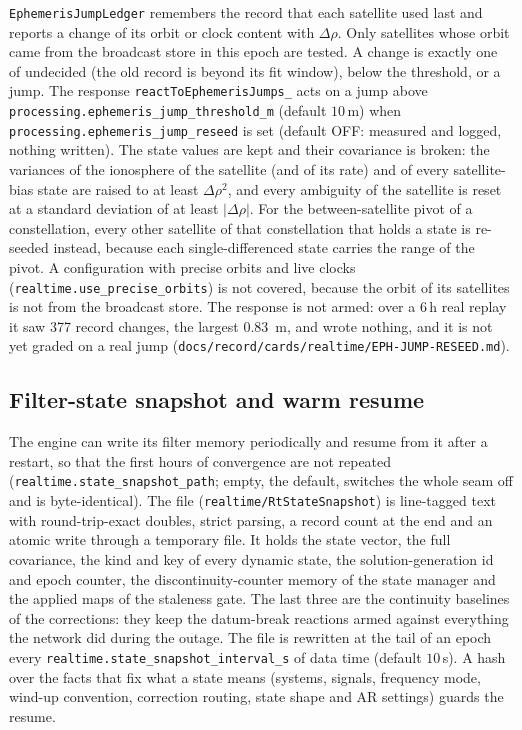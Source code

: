 \documentclass[main.tex]{subfiles}
\begin{document}
\texttt{EphemerisJumpLedger} remembers the record that each satellite used last
and reports a change of its orbit or clock content with $\Delta\rho$.  Only
satellites whose orbit came from the broadcast store in this epoch are tested.
A change is exactly one of undecided (the old record is beyond its fit window),
below the threshold, or a jump.  The response \texttt{reactToEphemerisJumps\_}
acts on a jump above \texttt{processing.ephemeris\_jump\_threshold\_m} (default
$10$\,m) when \texttt{processing.ephemeris\_jump\_reseed} is set (default OFF:
measured and logged, nothing written).  The state values are kept and their
covariance is broken: the variances of the ionosphere of the satellite (and of
its rate) and of every satellite-bias state are raised to at least
$\Delta\rho^{2}$, and every ambiguity of the satellite is reset at a standard
deviation of at least $|\Delta\rho|$.  For the between-satellite pivot of a
constellation, every other satellite of that constellation that holds a state is
re-seeded instead, because each single-differenced state carries the range of
the pivot.  A configuration with precise orbits and live clocks
(\texttt{realtime.use\_precise\_orbits}) is not covered, because the orbit of its
satellites is not from the broadcast store.  The response is not armed: over a
6\,h real replay it saw 377 record changes, the largest \SI{0.83}{\metre}, and
wrote nothing, and it is not yet graded on a real jump
(\texttt{docs/record/cards/realtime/EPH-JUMP-RESEED.md}).

\subsection{Filter-state snapshot and warm resume}\label{sec:rt-snapshot}

The engine can write its filter memory periodically and resume from it after a
restart, so that the first hours of convergence are not repeated
(\texttt{realtime.state\_snapshot\_path}; empty, the default, switches the whole
seam off and is byte-identical).  The file (\texttt{realtime/RtStateSnapshot}) is
line-tagged text with round-trip-exact doubles, strict parsing, a record count at
the end and an atomic write through a temporary file.  It holds the state vector,
the full covariance, the kind and key of every dynamic state, the
solution-generation id and epoch counter, the discontinuity-counter memory of
the state manager and the applied maps of the staleness gate.  The last three
are the continuity baselines of the corrections: they keep the datum-break
reactions armed against everything the network did during the outage.  The file
is rewritten at the tail of an epoch every
\texttt{realtime.state\_snapshot\_interval\_s} of data time (default $10$\,s).  A
hash over the facts that fix what a state means (systems, signals, frequency
mode, wind-up convention, correction routing, state shape and AR settings)
guards the resume.
\end{document}
